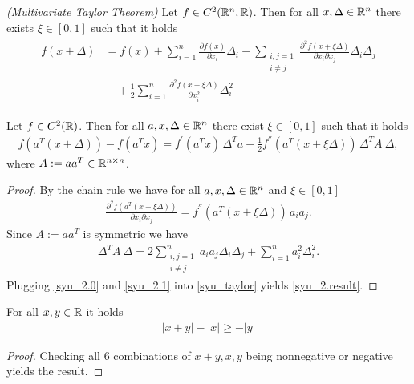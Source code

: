 


\begin{theorem}
  \emph{(Multivariate Taylor Theorem)}
  Let 
  $f \in C^2(\mathbb{R}^n, \mathbb{R})$.
  Then 
  for all $x, \Delta \in \mathbb{R}^n$
  there exists $\xi \in [0,1]$
  such that 
  it holds
  \begin{align}
    \label{syu_taylor}
    \begin{split}
    f(x + \Delta)
    &=
    f(x)
    +
    \sum_{i = 1}^{n} \frac{\partial f(x)}{\partial x_i} \Delta_i    
    + 
    \sum_{
    \begin{smallmatrix}
      i,j = 1 \\ 
      i \neq j
    \end{smallmatrix}
    }
    \frac{\partial^2 f(x + \xi \Delta)}{\partial x_i \partial x_j} \Delta_i\Delta_j
    \\
    & \quad+ 
    \frac{1}{2}\sum_{i = 1}^{n} \frac{\partial^2 f(x + \xi \Delta)}{\partial x_i^2}\Delta_i^2 
    \end{split}
  \end{align}
\end{theorem}


\begin{corollary}
  \label{syu_taylor_corollary}
  Let 
  $f\in C^2(\mathbb{R})$. 
  Then
  for all $a,x,\Delta \in \mathbb{R}^n$ 
  there exist $\xi \in [0,1]$ 
  such that it holds
  \begin{gather}
    \label{syu_2.result}
    f(a^T (x + \Delta)) - f(a^T x) = 
    f^{'}(a^T x)\, \Delta^T a + 
    \frac{1}{2}f^{''}(a^T (x + \xi \Delta))\, \Delta^T A\ \Delta,
  \end{gather}
  where 
  $A:= a a^T \in \mathbb{R}^{n \times n}$.
\end{corollary}

\begin{proof}
  By the chain rule 
  we have
  for all $a, x, \Delta \in \mathbb{R}^n$ and $\xi \in [0,1]$
  \begin{gather}
    \label{syu_2.0}
    \frac{\partial^2  f(a^T (x + \xi \Delta)) }{\partial x_i \partial x_j}
    =
    f^{''}(a^T (x + \xi \Delta))\, a_i a_j
    .
  \end{gather}
  Since 
  $A:= a a^T$ is symmetric
  we have
  \begin{gather}
    \label{syu_2.1}
    \Delta^T A\ \Delta 
    =
    2
    \sum_{
    \begin{smallmatrix}
      i,j = 1 \\ 
      i \neq j
    \end{smallmatrix}
    }
    ^{n}
    a_i a_j \Delta_i \Delta_j
    + 
    \sum_{i=1}^{n} 
    a_i^2 \Delta_i^2.
  \end{gather}
  Plugging \eqref{syu_2.0} and \eqref{syu_2.1} into \eqref{syu_taylor}
  yields
  \eqref{syu_2.result}.
\end{proof}

\begin{proposition}
  \label{syu_triangle}
  For all 
  $x, y \in \mathbb{R}$ 
  it holds
  \begin{gather}
    |x + y| - |x| \ge -|y|
  \end{gather}
\end{proposition}

\begin{proof}
  Checking all 6 combinations of
  $x + y, x, y$ 
  being nonnegative or negative 
  yields the result.
\end{proof}
